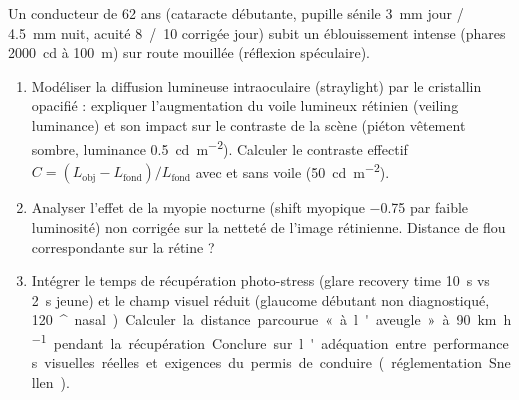 \documentclass[11pt]{article}
\providecommand{\degree}{^{\circ}}
\begin{document}
\begin{exercice}
Un conducteur de 62 ans (cataracte débutante, pupille sénile \SI{3}{\milli\meter} jour / \SI{4,5}{\milli\meter} nuit, acuité \SI{8}{/10} corrigée jour) subit un éblouissement intense (phares \SI{2000}{\candela} à \SI{100}{\meter}) sur route mouillée (réflexion spéculaire).
\begin{enumerate}
    \item Modéliser la diffusion lumineuse intraoculaire (straylight) par le cristallin opacifié : expliquer l'augmentation du voile lumineux rétinien (veiling luminance) et son impact sur le contraste de la scène (piéton vêtement sombre, luminance \SI{0,5}{\candela\per\square\metre}). Calculer le contraste effectif $C = (L_{\text{obj}} - L_{\text{fond}}) / L_{\text{fond}}$ avec et sans voile (\SI{50}{\candela\per\square\metre}).
    \item Analyser l'effet de la myopie nocturne (shift myopique \SI{-0,75}{} par faible luminosité) non corrigée sur la netteté de l'image rétinienne. Distance de flou correspondante sur la rétine ?
    \item Intégrer le temps de récupération photo-stress (glare recovery time \approx \SI{10}{\second} vs \SI{2}{\second} jeune) et le champ visuel réduit (glaucome débutant non diagnostiqué, \SI{120}{\degree} nasal). Calculer la distance parcourue « à l'aveugle » à \SI{90}{\kilo\metre\per\hour} pendant la récupération. Conclure sur l'adéquation entre performances visuelles réelles et exigences du permis de conduire (réglementation Snellen).
\end{enumerate}
\end{exercice}
\end{document}
